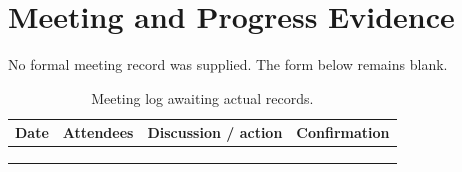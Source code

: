 \chapter{Meeting and Progress Evidence}
No formal meeting record was supplied. The form below remains blank.
\begin{longtable}{p{}p{}p{}p{}}
\caption{Meeting log awaiting actual records.}\\\toprule Date & Attendees & Discussion / action & Confirmation\\\midrule
\rule{0pt}{12mm} & & & \\
\rule{0pt}{12mm} & & & \\
\rule{0pt}{12mm} & & & \\
\bottomrule\end{longtable}
